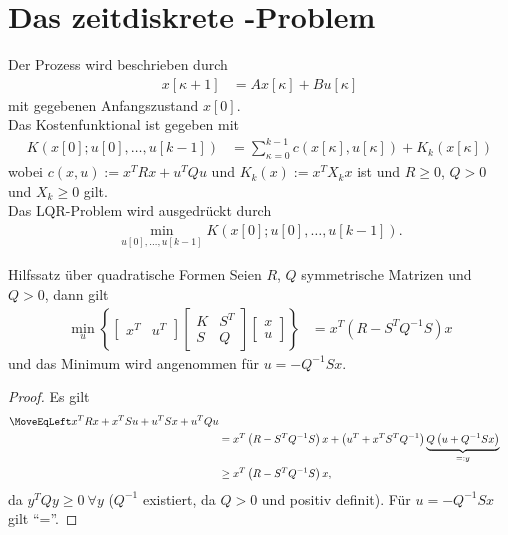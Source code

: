 \section{Das zeitdiskrete -Problem}
Der Prozess wird beschrieben durch
\begin{align}
	x[\kappa + 1] & = Ax[\kappa] + B u[\kappa]
\end{align}
mit gegebenen Anfangszustand $x[0]$.\\
Das Kostenfunktional ist gegeben mit
\begin{align}
	K\left(x[0];u[0],\ldots,u[k-1] \right) & = \sum\limits_{\kappa=0}^{k-1}c\left(x[\kappa],u[\kappa] \right) + K_k(x[\kappa])
\end{align}
wobei $c(x,u):=x^TRx + u^TQu$ und $K_k(x):=x^TX_kx$ ist und $R\geq0$, $Q>0$ und $X_k\geq 0$ gilt.\\
Das \ac{LQR}-Problem wird ausgedrückt durch
\begin{align}
	\min\limits_{u[0],\ldots,u[k-1]}K\left(x[0];u[0],\ldots,u[k-1] \right).
\end{align}
\begin{satz}{Hilfssatz über quadratische Formen}\label{satz:kap_3_quad_form}
Seien $R$, $Q$ symmetrische Matrizen und $Q>0$, dann gilt
\begin{align}
	\min\limits_u\left\{\begin{bmatrix}
	x^T	& u^T
	\end{bmatrix}\begin{bmatrix}
	K	&	S^T\\ S	&	Q
	\end{bmatrix}\begin{bmatrix}
	x\\ u
	\end{bmatrix} \right\} & = x^T\left(R-S^TQ^{-1}S \right)x
\end{align}
und das Minimum wird angenommen für $u=-Q^{-1}Sx$.
\end{satz}
\begin{proof}
Es gilt 
\begin{align}
	\MoveEqLeft x^TRx + x^TS u + u^TS x + u^TQ u\\ 
	& = x^T\left(R-S^TQ^{-1}S \right)x + \left(u^T + x^TS^TQ^{-1} \right)\underbrace{Q\left(u + Q^{-1}Sx \right) }_{=:y}\\
	& \geq x^T \left(R-S^TQ^{-1}S \right)x,
\end{align}
da $y^TQy\geq 0\ \forall y$ ($Q^{-1}$ existiert, da $Q>0$ und positiv definit). Für $u=-Q^{-1}Sx$ gilt "`="'.
\end{proof}
